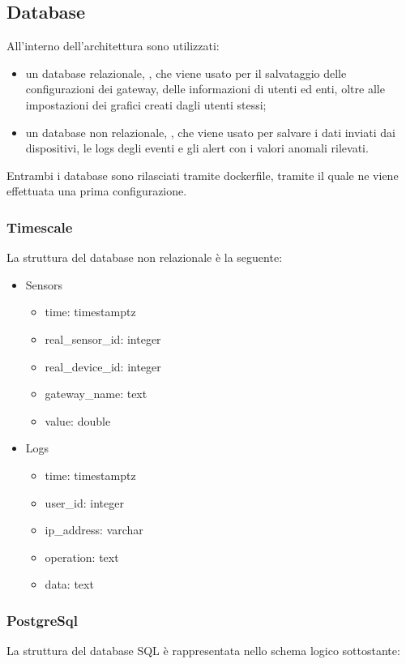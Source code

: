 \subsection{Database}
	All'interno dell'architettura sono utilizzati:
	\begin{itemize}
		\item un database relazionale, , che viene usato per il salvataggio delle configurazioni dei gateway, delle informazioni di utenti ed enti, oltre alle impostazioni dei grafici creati dagli utenti stessi;
		\item un database non relazionale, , che viene usato per salvare i dati inviati dai dispositivi, le logs degli eventi e gli alert con i valori anomali rilevati. 
	\end{itemize}
	Entrambi i database sono rilasciati tramite dockerfile, tramite il quale ne viene effettuata una prima configurazione.
	\subsubsection{Timescale}
	La struttura del database non relazionale è la seguente:
	\begin{itemize}
		\item Sensors
		\begin{itemize}
			\item time: timestamptz
			\item real\_sensor\_id: integer
			\item real\_device\_id: integer
			\item gateway\_name: text
			\item value: double
		\end{itemize}
		\item Logs
		\begin{itemize}
			\item time: timestamptz
			\item user\_id: integer
			\item ip\_address: varchar
			\item operation: text
			\item data: text
		\end{itemize}
	\end{itemize}
	\subsubsection{PostgreSql}
	La struttura del database SQL è rappresentata nello schema logico sottostante:
		
